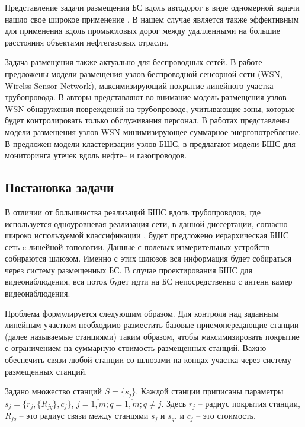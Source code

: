 Представление задачи размещения БС вдоль автодорог в виде одномерной задачи нашло свое широкое применение \cite{Ivanov2018, Reis2014, Vishnevsky2016_optimization, Liu2014, Gao2018, Jalooli2019, Zhang2017}. В нашем случае является также эффективным для применения вдоль промысловых дорог между удалленными на большие расстояния объектами нефтегазовых отрасли.

Задача размещения также актуально для беспроводных сетей. В работе \cite{Alduraibi2016} предложены модели размещения узлов беспроводной сенсорной сети (WSN, Wirelss Sensor Network), максимизирующий покрытие линейного участка трубопровода. В \cite{Aria2020} авторы представляют во внимание модель размещения узлов WSN обнаружения повреждений на трубопроводе, учитывающие зоны, которые будет контролировать только обслуживания персонал. В работах \cite{Hussein2020, Varshney2018, Varshney2021} представлены модели размещения узлов WSN минимизирующее суммарное энергопотребление. В \cite{Li2020, Albaseer2019} предложен модели кластеризации узлов БШС, в \cite{Albaseer2019} предлагают модели БШС для мониторинга утечек вдоль нефте-- и газопроводов.

\subsection{Постановка задачи}

В отличии от большинства реализаций БШС вдоль трубопроводов, где используется одноуровневая реализация сети, в данной диссертации, согласно широко используемой классификации \cite{Jawhar2009, Varshney2015, Abbas2018, Wang2011, Jawhar2013}, будет предложено иерархическая БШС сеть c линейной топологии. Данные с полевых измерительных устройств собираются шлюзом. Именно с этих шлюзов вся информация будет собираться через систему размещенных БС. В случае проектирования БШС для видеонаблюдения, вся поток будет идти на БС непосредственно с антенн камер видеонаблюдения.


Проблема формулируется следующим образом. Для контроля над заданным линейным участком необходимо разместить базовые приемопередающие станции (далее называемые станциями) таким образом, чтобы максимизировать покрытие с ограничением на суммарную стоимость размещенных станций. Важно обеспечить связи любой станции со шлюзами на концах участка через систему размещенных станций.

Задано множество станций $S = \{s_j\}$. Каждой станции приписаны параметры $s_j = \{r_j, \{R_{jq}\}, c_j \}$, $j = \overline{1,m}; q = \overline{1,m}; q \neq j$. Здесь $r_j$ -- радиус покрытия станции, $R_{jq}$ -- это радиус связи между станцями $s_j$ и $s_q$, и $c_j$ -- это стоимость. 

